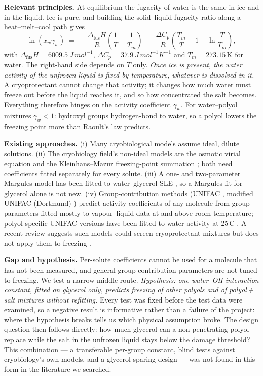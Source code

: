\documentclass[10pt,a4paper]{article}
\newcommand{\dfus}{\Delta_{\mathrm{fus}}}
\begin{document}
\textbf{Relevant principles.} At equilibrium the fugacity of water is the same in ice and in the liquid.
Ice is pure, and building the solid--liquid fugacity ratio along a heat--melt--cool path \cite{sandler} gives
\begin{equation}
\ln(x_w\gamma_w) \;=\; -\frac{\dfus H}{R}\left(\frac{1}{T}-\frac{1}{T_m}\right)
 \;-\; \frac{\Delta C_p}{R}\left(\frac{T_m}{T}-1+\ln\frac{T}{T_m}\right),
\label{eq:sle}
\end{equation}
with $\dfus H=\SI{6009.5}{J\,mol^{-1}}$, $\Delta C_p=\SI{37.9}{J\,mol^{-1}K^{-1}}$ and $T_m=273.15$\,K for water.
The right-hand side depends on $T$ only. \emph{Once ice is present, the water activity of the unfrozen liquid
is fixed by temperature, whatever is dissolved in it.} A cryoprotectant cannot change that activity; it changes
how much water must freeze out before the liquid reaches it, and so how concentrated the salt becomes.
Everything therefore hinges on the activity coefficient $\gamma_w$. For water--polyol mixtures $\gamma_w<1$:
hydroxyl groups hydrogen-bond to water, so a polyol lowers the freezing point more than Raoult's law predicts.

\textbf{Existing approaches.} (i) Many cryobiological models assume ideal, dilute solutions. (ii) The
cryobiology field's non-ideal models are the osmotic virial equation \cite{elliott,zielinski} and the
Kleinhans--Mazur freezing-point summation \cite{km}; both need coefficients fitted separately for every
solute. (iii) A one- and two-parameter Margules model has been fitted to water--glycerol SLE
\cite{zargarzadeh}, so a Margules fit for glycerol alone is not new. (iv) Group-contribution methods
(UNIFAC \cite{unifac}, modified UNIFAC (Dortmund) \cite{dortmund}) predict activity coefficients of any
molecule from group parameters fitted mostly to vapour--liquid data at and above room temperature; polyol-specific
UNIFAC versions have been fitted to water activity at 25\,\textdegree C \cite{marcolli,peres}. A recent review suggests such
models could screen cryoprotectant mixtures but does not apply them to freezing \cite{powellpalm}.

\textbf{Gap and hypothesis.} Per-solute coefficients cannot be used for a molecule that has not been
measured, and general group-contribution parameters are not tuned to freezing. We test a narrow middle
route. \emph{Hypothesis: one water--OH interaction constant, fitted on glycerol only, predicts freezing of
other polyols and of polyol\,+\,salt mixtures without refitting.} Every test was fixed before the test data
were examined, so a negative result is informative rather than a failure of the project: where the
hypothesis breaks tells us which physical assumption broke. The design question then follows directly: how
much glycerol can a non-penetrating polyol replace while the salt in the unfrozen liquid stays below the
damage threshold? This combination --- a transferable per-group constant, blind tests against cryobiology's
own models, and a glycerol-sparing design --- was not found in this form in the literature we searched.
\end{document}
